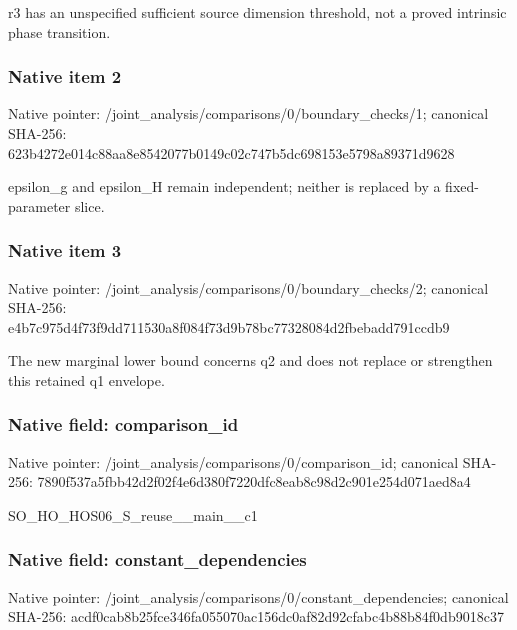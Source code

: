 \documentclass[10pt,a4paper]{article}
\begin{document}
\begingroup\raggedright\sloppy r3 has an unspecified sufficient source dimension threshold,\allowbreak{} not a proved intrinsic phase transition.\par\endgroup

\subsubsection{Native item 2}
Native pointer: /joint\_\allowbreak{}analysis/comparisons/0/boundary\_\allowbreak{}checks/1; canonical SHA-256: 623b4272e014c88aa8e8542077b0149c02c747b5dc698153e5798a89371d9628

\begingroup\raggedright\sloppy epsilon\_\allowbreak{}g and epsilon\_\allowbreak{}H remain independent;\allowbreak{} neither is replaced by a fixed-parameter slice.\par\endgroup

\subsubsection{Native item 3}
Native pointer: /joint\_\allowbreak{}analysis/comparisons/0/boundary\_\allowbreak{}checks/2; canonical SHA-256: e4b7c975d4f73f9dd711530a8f084f73d9b78bc77328084d2fbebadd791ccdb9

\begingroup\raggedright\sloppy The new marginal lower bound concerns q2 and does not replace or strengthen this retained q1 envelope.\par\endgroup

\subsubsection{Native field: comparison\_\allowbreak{}id}
Native pointer: /joint\_\allowbreak{}analysis/comparisons/0/comparison\_\allowbreak{}id; canonical SHA-256: 7890f537a5fbb42d2f02f4e6d380f7220dfc8eab8c98d2c901e254d071aed8a4

\begingroup\raggedright\sloppy SO\_\allowbreak{}HO\_\allowbreak{}HOS06\_\allowbreak{}S\_\allowbreak{}reuse\_\allowbreak{}\_\allowbreak{}main\_\allowbreak{}\_\allowbreak{}c1\par\endgroup

\subsubsection{Native field: constant\_\allowbreak{}dependencies}
Native pointer: /joint\_\allowbreak{}analysis/comparisons/0/constant\_\allowbreak{}dependencies; canonical SHA-256: acdf0cab8b25fce346fa055070ac156dc0af82d92cfabc4b88b84f0db9018c37
\end{document}

